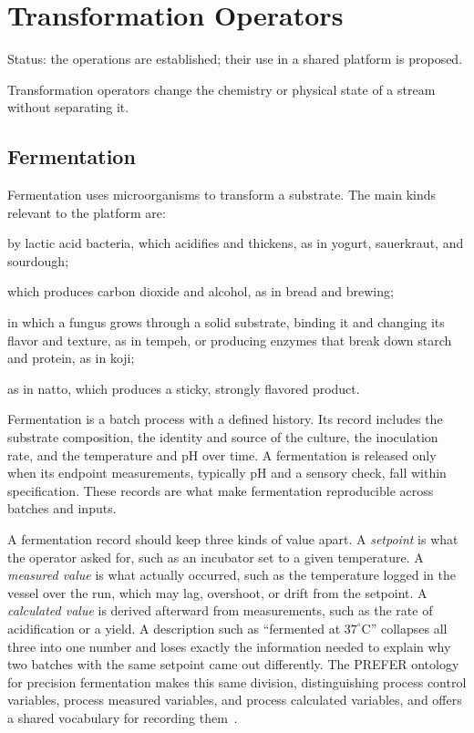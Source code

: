\documentclass[11pt,openany]{book}
\theoremstyle{definition}
\begin{document}
\chapter{Transformation Operators}\label{ch:transformation}

Status: the operations are established; their use in a shared platform is proposed.

Transformation operators change the chemistry or physical state of a stream without separating it.

\section{Fermentation}

Fermentation uses microorganisms to transform a substrate. The main kinds relevant to the platform are:

\begin{description}[leftmargin=1.5em]
\item[Lactic acid fermentation,] by lactic acid bacteria, which acidifies and thickens, as in yogurt, sauerkraut, and sourdough;
\item[Yeast fermentation,] which produces carbon dioxide and alcohol, as in bread and brewing;
\item[Mold fermentation,] in which a fungus grows through a solid substrate, binding it and changing its flavor and texture, as in tempeh, or producing enzymes that break down starch and protein, as in koji;
\item[Bacterial solid-state fermentation,] as in natto, which produces a sticky, strongly flavored product.
\end{description}

Fermentation is a batch process with a defined history. Its record includes the substrate composition, the identity and source of the culture, the inoculation rate, and the temperature and pH over time. A fermentation is released only when its endpoint measurements, typically pH and a sensory check, fall within specification. These records are what make fermentation reproducible across batches and inputs.

A fermentation record should keep three kinds of value apart. A \emph{setpoint} is what the operator asked for, such as an incubator set to a given temperature. A \emph{measured value} is what actually occurred, such as the temperature logged in the vessel over the run, which may lag, overshoot, or drift from the setpoint. A \emph{calculated value} is derived afterward from measurements, such as the rate of acidification or a yield. A description such as ``fermented at $37^\circ$C'' collapses all three into one number and loses exactly the information needed to explain why two batches with the same setpoint came out differently. The PREFER ontology for precision fermentation makes this same division, distinguishing process control variables, process measured variables, and process calculated variables, and offers a shared vocabulary for recording them~\cite{prefer2026}.
\end{document}
